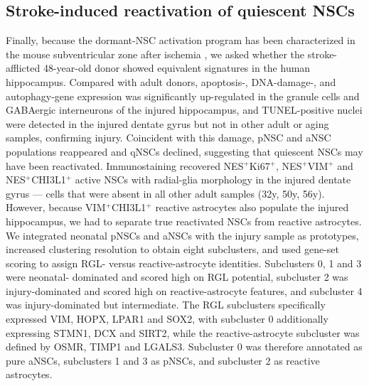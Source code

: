\documentclass[11pt]{article}
\begin{document}
\subsection{Stroke-induced reactivation of quiescent NSCs}

Finally, because the dormant-NSC activation program has been characterized
in the mouse subventricular zone after ischemia
\cite{llorensbobadilla2015single}, we asked whether the stroke-afflicted
48-year-old donor showed equivalent signatures in the human hippocampus.
Compared with adult donors, apoptosis-, DNA-damage-, and autophagy-gene
expression was significantly up-regulated in the granule cells and
GABAergic interneurons of the injured hippocampus, and TUNEL-positive
nuclei were detected in the injured dentate gyrus but not in other
adult or aging samples, confirming injury. Coincident with this damage,
pNSC and aNSC populations reappeared and qNSCs declined, suggesting that
quiescent NSCs may have been reactivated. Immunostaining recovered
NES$^+$Ki67$^+$, NES$^+$VIM$^+$ and NES$^+$CHI3L1$^+$ active NSCs with
radial-glia morphology in the injured dentate gyrus --- cells that were
absent in all other adult samples (32y, 50y, 56y). However, because
VIM$^+$CHI3L1$^+$ reactive astrocytes also populate the injured
hippocampus, we had to separate true reactivated NSCs from reactive
astrocytes. We integrated neonatal pNSCs and aNSCs with the injury
sample as prototypes, increased clustering resolution to obtain eight
subclusters, and used gene-set scoring to assign RGL- versus
reactive-astrocyte identities. Subclusters 0, 1 and 3 were neonatal-
dominated and scored high on RGL potential, subcluster 2 was
injury-dominated and scored high on reactive-astrocyte features, and
subcluster 4 was injury-dominated but intermediate. The RGL subclusters
specifically expressed VIM, HOPX, LPAR1 and SOX2, with subcluster 0
additionally expressing STMN1, DCX and SIRT2, while the reactive-astrocyte
subcluster was defined by OSMR, TIMP1 and LGALS3. Subcluster 0 was
therefore annotated as pure aNSCs, subclusters 1 and 3 as pNSCs, and
subcluster 2 as reactive astrocytes.
\end{document}
